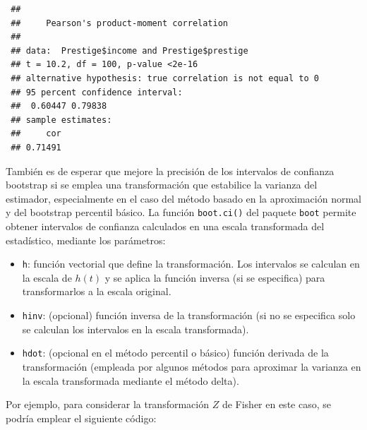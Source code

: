 \documentclass[
  10pt,
]{book}
\theoremstyle{break}
\theoremstyle{nonumberplain}
\begin{document}
\begin{verbatim}
 ## 
 ##     Pearson's product-moment correlation
 ## 
 ## data:  Prestige$income and Prestige$prestige
 ## t = 10.2, df = 100, p-value <2e-16
 ## alternative hypothesis: true correlation is not equal to 0
 ## 95 percent confidence interval:
 ##  0.60447 0.79838
 ## sample estimates:
 ##     cor 
 ## 0.71491
\end{verbatim}

También es de esperar que mejore la precisión de los intervalos de confianza bootstrap si se emplea una transformación que estabilice la varianza del estimador, especialmente en el caso del método basado en la aproximación normal y del bootstrap percentil básico.
La función \texttt{boot.ci()} del paquete \texttt{boot} permite obtener intervalos de confianza calculados en una escala transformada del estadístico, mediante los parámetros:

\begin{itemize}
\item
  \texttt{h}: función vectorial que define la transformación.
  Los intervalos se calculan en la escala de \(h(t)\) y se aplica la función inversa (si se especifica) para transformarlos a la escala original.
\item
  \texttt{hinv}: (opcional) función inversa de la transformación
  (si no se especifica solo se calculan los intervalos en la escala transformada).
\item
  \texttt{hdot}: (opcional en el método percentil o básico) función derivada de la transformación
  (empleada por algunos métodos para aproximar la varianza en la escala transformada mediante el método delta).
\end{itemize}

Por ejemplo, para considerar la transformación \(Z\) de Fisher en este caso, se podría emplear el siguiente código:
\end{document}
